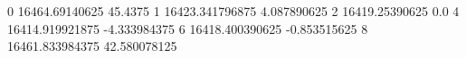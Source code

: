 0 16464.69140625 45.4375
1 16423.341796875 4.087890625
2 16419.25390625 0.0
4 16414.919921875 -4.333984375
6 16418.400390625 -0.853515625
8 16461.833984375 42.580078125
